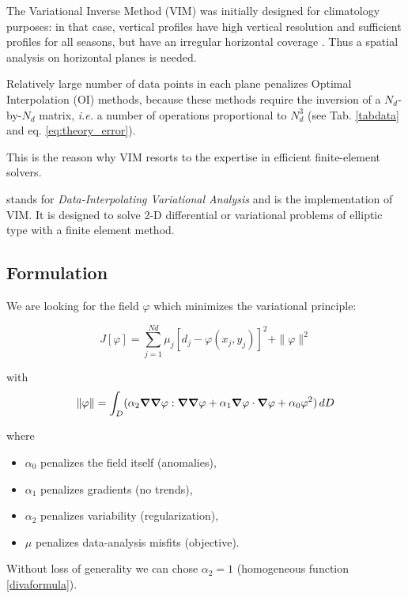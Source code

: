 The Variational Inverse Method (VIM) was initially designed for climatology purposes: in that case, vertical profiles have high vertical resolution and sufficient profiles for all seasons, but have an irregular horizontal coverage \citep{BRASSEUR96}. Thus a spatial analysis on horizontal planes is needed. 

Relatively large number of data points in each plane penalizes Optimal Interpolation (OI) methods, because these methods require the inversion of a $N_{d}$-by-$N_{d}$ matrix, \textit{i.e.} a number of operations proportional to $N_{d}^{3}$ (see Tab. \ref{tabdata} and eq. \ref{eq:theory_error}).

This is the reason why VIM resorts to the expertise in efficient finite-element solvers.

\diva stands for \textit{Data-Interpolating Variational Analysis} and is the implementation of VIM. It is designed to solve 2-D differential or variational problems of elliptic type with a finite element method.


\subsection{Formulation\label{sec:formulation}}

We are looking for the field $\varphi$ which minimizes the variational principle:

\begin{equation}
J \left[\varphi\right] =\sum_{j=1}^{Nd}\mu_{j}\left[d_{j}-\varphi(x_{j},y_{j})\right]^{2}+
\| \varphi\| ^{2}
\label{divaformula}
\end{equation}

with
\begin{equation}
\|\varphi\|=\int_{D}(
\alpha_{2} 
\boldsymbol{\nabla}\boldsymbol{\nabla}\varphi : \boldsymbol{\nabla}\boldsymbol{\nabla}\varphi +\alpha_{1}
\boldsymbol{\nabla}\varphi \cdot \boldsymbol{\nabla}\varphi + \alpha_{0} \varphi^{2})\, d D
\label{divaformula2}
\end{equation}

where
\begin{itemize}
\item
$\alpha_0$ penalizes the field itself (anomalies),
\item
$\alpha_1$ penalizes gradients (no trends),
\item 
$\alpha_2$ penalizes variability (regularization),
\item 
$\mu$ penalizes data-analysis misfits (objective).
\end{itemize}
Without loss of generality we can chose $\alpha_2=1$ (homogeneous function \ref{divaformula}).



